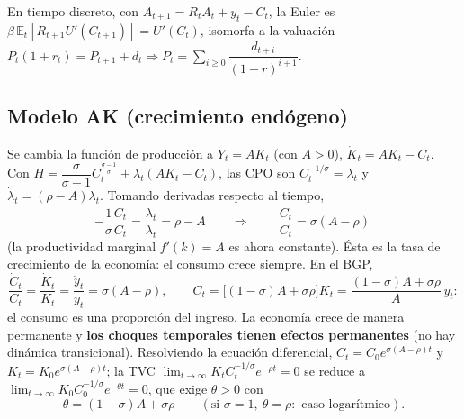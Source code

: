 \documentclass[11pt]{article}
\renewcommand{\boxed}[1]{#1}     %
\theoremstyle{definition}
\newcommand{\E}{\mathbb{E}}
\begin{document}
En tiempo discreto, con $A_{t+1}=R_{t}A_{t}+y_{t}-C_{t}$, la Euler es
$\beta\,\E_{t}[R_{t+1}U'(C_{t+1})]=U'(C_{t})$, isomorfa a la valuación
$P_{t}(1+r_{t})=P_{t+1}+d_{t}\Rightarrow P_{t}=\sum_{i\ge0}\dfrac{d_{t+i}}{(1+r)^{i+1}}$.

\subsection{Modelo AK (crecimiento endógeno)}

Se cambia la función de producción a $Y_{t}=AK_{t}$ (con $A>0$), $\dot{K}_{t}=AK_{t}-C_{t}$. Con
$H=\dfrac{\sigma}{\sigma-1}C_{t}^{\frac{\sigma-1}{\sigma}}+\lambda_{t}(AK_{t}-C_{t})$, las CPO son
$C_{t}^{-1/\sigma}=\lambda_{t}$ y $\dot{\lambda}_{t}=(\rho-A)\lambda_{t}$. Tomando derivadas respecto
al tiempo,
\begin{equation}
-\frac{1}{\sigma}\frac{\dot{C}_{t}}{C_{t}}=\frac{\dot{\lambda}_{t}}{\lambda_{t}}=\rho-A
\qquad\Longrightarrow\qquad
\boxed{\ \frac{\dot{C}_{t}}{C_{t}}=\sigma(A-\rho)\ }
\end{equation}
(la productividad marginal $f'(k)=A$ es ahora constante). Ésta es la tasa de crecimiento de la
economía: el consumo crece siempre. En el BGP,
\begin{equation}
\frac{\dot{C}_{t}}{C_{t}}=\frac{\dot{K}_{t}}{K_{t}}=\frac{\dot{y}_{t}}{y_{t}}=\sigma(A-\rho),
\qquad
C_{t}=\big[(1-\sigma)A+\sigma\rho\big]K_{t}=\frac{(1-\sigma)A+\sigma\rho}{A}\,y_{t}:
\end{equation}
el consumo es una proporción del ingreso. La economía crece de manera permanente y \textbf{los choques
temporales tienen efectos permanentes} (no hay dinámica transicional). Resolviendo la ecuación
diferencial, $C_{t}=C_{0}e^{\sigma(A-\rho)t}$ y $K_{t}=K_{0}e^{\sigma(A-\rho)t}$; la TVC
$\lim_{t\to\infty}K_{t}C_{t}^{-1/\sigma}e^{-\rho t}=0$ se reduce a
$\lim_{t\to\infty}K_{0}C_{0}^{-1/\sigma}e^{-\theta t}=0$, que exige $\theta>0$ con
\begin{equation}
\theta=(1-\sigma)A+\sigma\rho\qquad(\text{si }\sigma=1,\ \theta=\rho:\text{ caso logarítmico}).
\end{equation}
\end{document}

